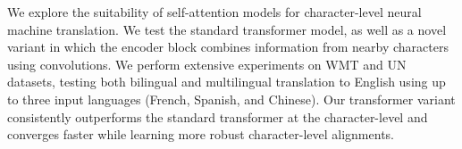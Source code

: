 We explore the suitability of self-attention models for character-level neural machine translation. We test the standard transformer model, as well as a novel variant in which the encoder block combines information from nearby characters using convolutions. We perform extensive experiments on WMT and UN datasets, testing both bilingual and multilingual translation to English using up to three input languages (French, Spanish, and Chinese). Our transformer variant consistently outperforms the standard transformer at the character-level and converges faster while learning more robust character-level alignments.
